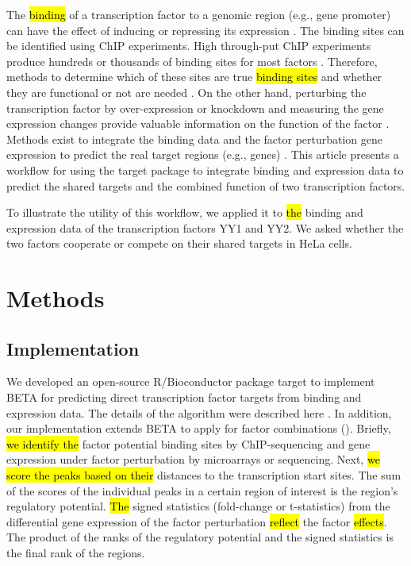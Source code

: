 \documentclass[9pt,a4paper,]{extarticle}
\begin{document}
The \hl{binding} of a transcription factor to a genomic region (e.g., gene promoter) can have the effect of inducing or repressing its expression \citet{Latchman2001}. The binding sites can be identified using ChIP experiments. High through-put ChIP experiments produce hundreds or thousands of binding sites for most factors \citet{Johnson2007a}. Therefore, methods to determine which of these sites are true \hl{binding sites} and whether they are functional or not are needed \citet{Ucar2009}. On the other hand, perturbing the transcription factor by over-expression or knockdown and measuring the gene expression changes provide valuable information on the function of the factor \citet{Tran2005}. Methods exist to integrate the binding data and the factor perturbation gene expression to predict the real target regions (e.g., genes) \citep{Subramanian2005, Wang2013b}. This article presents a workflow for using the target package to integrate binding and expression data to predict the shared targets and the combined function of two transcription factors.

To illustrate the utility of this workflow, we applied it to \hl{the} binding and expression data of the transcription factors YY1 and YY2. We asked whether the two factors cooperate or compete on their shared targets in HeLa cells.

\hypertarget{methods}{%
\section{Methods}\label{methods}}

\hypertarget{implementation}{%
\subsection{Implementation}\label{implementation}}

We developed an open-source R/Bioconductor package target to implement BETA for predicting direct transcription factor targets from binding and expression data. The details of the algorithm were described here \citet{Wang2013b}. In addition, our implementation extends BETA to apply for factor combinations (\citet{Ahmed2020}). Briefly, \hl{we identify the} factor potential binding sites by ChIP-sequencing and gene expression under factor perturbation by microarrays or sequencing. Next, \hl{we score the peaks based on their} distances to the transcription start sites. The sum of the scores of the individual peaks in a certain region of interest is the region's regulatory potential. \hl{The} signed statistics (fold-change or t-statistics) from the differential gene expression of the factor perturbation \hl{reflect} the factor \hl{effects}. The product of the ranks of the regulatory potential and the signed statistics is the final rank of the regions.
\end{document}
